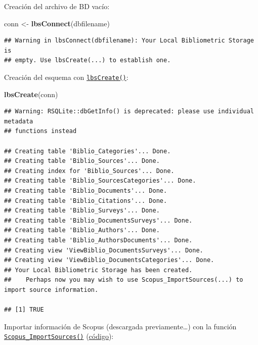\documentclass[
]{book}
\newenvironment{Shaded}{\begin{snugshade}}{\end{snugshade}}
\newcommand{\FunctionTok}[1]{\textcolor[rgb]{0.13,0.29,0.53}{\textbf{#1}}}
\newcommand{\NormalTok}[1]{#1}
\newcommand{\OtherTok}[1]{\textcolor[rgb]{0.56,0.35,0.01}{#1}}
\begin{document}
Creación del archivo de BD vacío:

\begin{Shaded}
\begin{Highlighting}[]
\NormalTok{conn }\OtherTok{\textless{}{-}} \FunctionTok{lbsConnect}\NormalTok{(dbfilename)}
\end{Highlighting}
\end{Shaded}

\begin{verbatim}
## Warning in lbsConnect(dbfilename): Your Local Bibliometric Storage is
## empty. Use lbsCreate(...) to establish one.
\end{verbatim}

Creación del esquema con \href{https://www.rdocumentation.org/packages/CITAN/versions/2015.12-2/topics/lbsCreate}{\texttt{lbsCreate()}}:

\begin{Shaded}
\begin{Highlighting}[]
\FunctionTok{lbsCreate}\NormalTok{(conn) }
\end{Highlighting}
\end{Shaded}

\begin{verbatim}
## Warning: RSQLite::dbGetInfo() is deprecated: please use individual metadata
## functions instead

## Creating table 'Biblio_Categories'... Done.
## Creating table 'Biblio_Sources'... Done.
## Creating index for 'Biblio_Sources'... Done.
## Creating table 'Biblio_SourcesCategories'... Done.
## Creating table 'Biblio_Documents'... Done.
## Creating table 'Biblio_Citations'... Done.
## Creating table 'Biblio_Surveys'... Done.
## Creating table 'Biblio_DocumentsSurveys'... Done.
## Creating table 'Biblio_Authors'... Done.
## Creating table 'Biblio_AuthorsDocuments'... Done.
## Creating view 'ViewBiblio_DocumentsSurveys'... Done.
## Creating view 'ViewBiblio_DocumentsCategories'... Done.
## Your Local Bibliometric Storage has been created.
##    Perhaps now you may wish to use Scopus_ImportSources(...) to import source information.

## [1] TRUE
\end{verbatim}

Importar información de Scopus (descargada previamente\ldots)
con la función \href{https://www.rdocumentation.org/packages/CITAN/versions/2015.12-2/topics/Scopus_ImportSources}{\texttt{Scopus\_ImportSources()}} (\href{https://github.com/gagolews/CITAN/blob/master/R/scopus.importsources.R}{código}):
\end{document}
